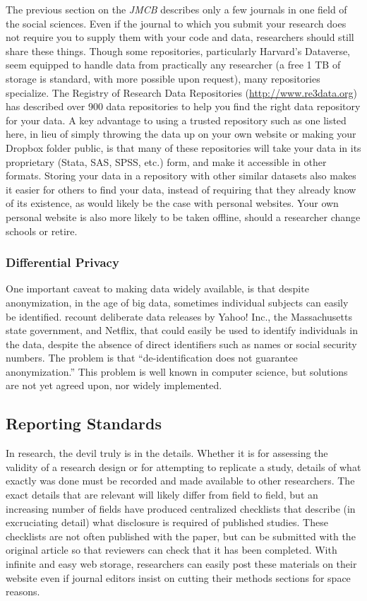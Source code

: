 \documentclass[12pt] {article}
\begin{document}
The previous section on the \emph{JMCB} describes only a few journals in
one field of the social sciences. Even if the journal to which you
submit your research does not require you to supply them with your code
and data, researchers should still share these things. Though some
repositories, particularly Harvard's Dataverse, seem equipped to handle
data from practically any researcher (a free 1 TB of storage is
standard, with more possible upon request), many repositories specialize. The
Registry of Research Data Repositories (\url{http://www.re3data.org})
has described over 900 data repositories to help you find the right data
repository for your data. A key advantage to using a trusted repository
such as one listed here, in lieu of simply throwing the data up on your
own website or making your Dropbox folder public, is that many of these
repositories will take your data in its proprietary (Stata, SAS, SPSS,
etc.) form, and make it accessible in other formats. Storing your data in a repository with other similar datasets also makes it easier for others to find your data, instead of requiring that they already know of its existence, as would likely be the case with personal websites. Your own personal website is also more likely to be taken offline, should a researcher change schools or retire.

\subsubsection{Differential Privacy}\label{differential-privacy}

One important caveat to making data widely available, is that despite
anonymization, in the age of big data, sometimes individual subjects can
easily be identified. \cite{heffetz_privacy_2014} recount deliberate data
releases by Yahoo! Inc., the Massachusetts state government, and
Netflix, that could easily be used to identify individuals in the data,
despite the absence of direct identifiers such as names or social
security numbers. The problem is that ``de-identification does not
guarantee anonymization.'' This problem is well known in computer science, but solutions are not yet agreed upon, nor widely implemented.


\subsection{Reporting Standards}\label{reporting-standards}
In research, the devil truly is in the details. Whether it is for assessing the validity of a research design or for
attempting to replicate a study, details of what exactly was done must be recorded and made available to other researchers.
The exact details that are relevant will likely differ from field to field, but an increasing number of fields have
produced centralized checklists that describe (in excruciating detail) what disclosure is required of published studies. These checklists are not often published with the paper, but can be submitted with the original article so that reviewers can check that it has been completed. With infinite and easy web storage, researchers can easily post these materials on their website even if journal editors insist on cutting their methods sections for space reasons. 
\end{document}
